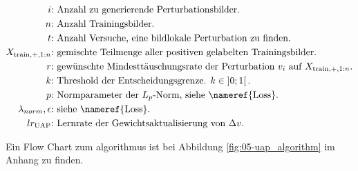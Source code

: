 \begin{align*}
i\text{:} &\text{ Anzahl zu generierende Perturbationsbilder.} \\
n\text{:} &\text{ Anzahl Trainingsbilder.} \\
t\text{:} &\text{ Anzahl Versuche, eine bildlokale Perturbation zu finden.}\\
X_{\text{train},+,1:n}\text{:} &\text{ gemischte Teilmenge aller positiven gelabelten Trainingsbilder.} \\
r\text{:} &\text{ gewünschte Mindesttäuschungsrate der Perturbation $v_i$ auf } X_{\text{train},+,1:n}.\\
k\text{:} &\text{ Threshold der Entscheidungsgrenze. } k \in \left] 0; 1 \right[. \\
p\text{:} &\text{ Normparameter der $L_p$-Norm, siehe \nameref{Loss}.}\\
\lambda_{norm},\epsilon\text{:} &\text{ siehe \nameref{Loss}.}\\
lr_{\text{UAP}}\text{:} &\text{ Lernrate der Gewichtsaktualisierung von $\Delta v$.}
\end{align*}

Ein Flow Chart zum \Gls{algorithmus} ist bei Abbildung \ref{fig:05-uap_algorithm} im Anhang zu finden. 

